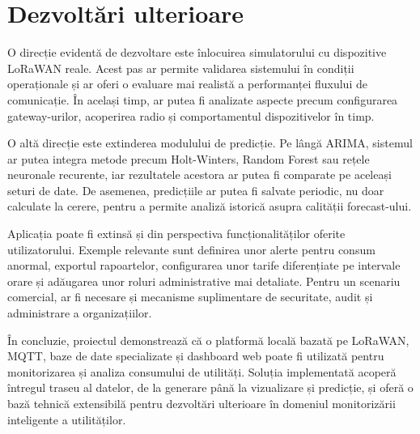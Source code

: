 \section{Dezvoltări ulterioare}

O direcție evidentă de dezvoltare este înlocuirea simulatorului cu dispozitive LoRaWAN reale. Acest pas ar permite validarea sistemului în condiții operaționale și ar oferi o evaluare mai realistă a performanței fluxului de comunicație. În același timp, ar putea fi analizate aspecte precum configurarea gateway-urilor, acoperirea radio și comportamentul dispozitivelor în timp.

O altă direcție este extinderea modulului de predicție. Pe lângă ARIMA, sistemul ar putea integra metode precum Holt-Winters, Random Forest sau rețele neuronale recurente, iar rezultatele acestora ar putea fi comparate pe aceleași seturi de date. De asemenea, predicțiile ar putea fi salvate periodic, nu doar calculate la cerere, pentru a permite analiză istorică asupra calității forecast-ului.

Aplicația poate fi extinsă și din perspectiva funcționalităților oferite utilizatorului. Exemple relevante sunt definirea unor alerte pentru consum anormal, exportul rapoartelor, configurarea unor tarife diferențiate pe intervale orare și adăugarea unor roluri administrative mai detaliate. Pentru un scenariu comercial, ar fi necesare și mecanisme suplimentare de securitate, audit și administrare a organizațiilor.

În concluzie, proiectul demonstrează că o platformă locală bazată pe LoRaWAN, MQTT, baze de date specializate și dashboard web poate fi utilizată pentru monitorizarea și analiza consumului de utilități. Soluția implementată acoperă întregul traseu al datelor, de la generare până la vizualizare și predicție, și oferă o bază tehnică extensibilă pentru dezvoltări ulterioare în domeniul monitorizării inteligente a utilităților.
